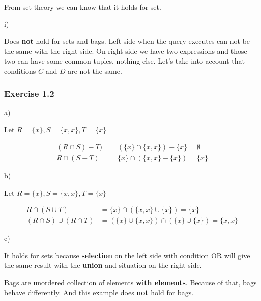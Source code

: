 \documentclass[../../main.tex]{subfiles}
\begin{document}
From set theory we can know that it holds for set.

i)

Does \textbf{not} hold for sets and bags. Left side when
the query executes can not be the same with the right side.
On right side we have two expressions and those two can
have some common tuples, nothing else. Let's take into
account that conditions $C$ and $D$ are not the same.

\subsubsection*{Exercise 1.2}

a)

Let $R = \{x\}, S= \{x, x\}, T = \{x\}$

\begin{align*}
  (R \cap S) - T) &=
    (\{x\} \cap \{x, x\}) - \{x\} = \emptyset\\
  R \cap (S - T) &=
    \{x\} \cap (\{x, x\} - \{x\}) = \{x\}
\end{align*}

b)

Let $R = \{x\}, S= \{x, x\}, T = \{x\}$

\begin{align*}
  R \cap (S \cup T) &=
    \{x\} \cap (\{x, x\} \cup \{x\}) = \{x\}\\
  (R \cap S) \cup (R \cap T) &=
    (\{x\} \cup \{x, x\}) \cap (\{x\} \cup \{x\}) = \{x, x\}
\end{align*}

c)

It holds for sets because \textbf{selection} on the left side
with condition OR will give the same result with the
\textbf{union} and situation on the right side.

Bags are unordered collection of elements \textbf{with elements}.
Because of that, bags behave differently. And this example does
\textbf{not} hold for bags.
\end{document}
